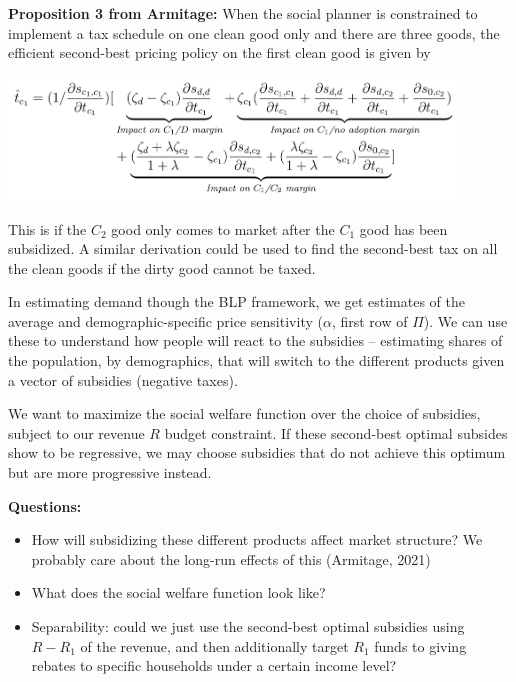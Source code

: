 \documentclass[12pt]{article}
\begin{document}
\textbf{Proposition 3 from Armitage:} When the social planner is constrained to implement a tax schedule on one clean good
only and there are three goods, the efficient second-best pricing policy on the first clean good is given by

\includegraphics[width=0.9\textwidth]{second-best-taxArmitage}

This is if the $C_2$ good only comes to market after the $C_1$ good has been subsidized. A similar derivation could be used to find the second-best tax on all the clean goods if the dirty good cannot be taxed.

In estimating demand though the BLP framework, we get estimates of the average and demographic-specific price sensitivity ($\alpha$, first row of $\Pi$). We can use these to understand how people will react to the subsidies -- estimating shares of the population, by demographics, that will switch to the different products given a vector of subsidies (negative taxes).

We want to maximize the social welfare function over the choice of subsidies, subject to our revenue $R$ budget constraint. If these second-best optimal subsides show to be regressive, we may choose subsidies that do not achieve this optimum but are more progressive instead.

\textbf{Questions:}
\begin{itemize}
    \item How will subsidizing these different products affect market structure? We probably care about the long-run effects of this (Armitage, 2021)
    \item What does the social welfare function look like?
    \item Separability: could we just use the second-best optimal subsidies using $R-R_1$ of the revenue, and then additionally target $R_1$ funds to giving rebates to specific households under a certain income level?
\end{itemize}
\end{document}
